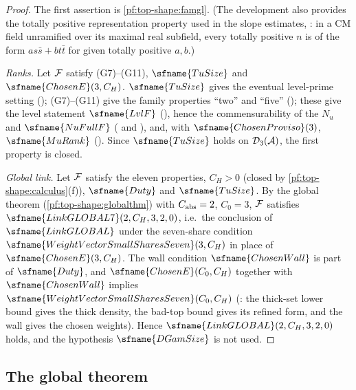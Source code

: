 \begin{proof}
The first assertion is \cref{pf:top-shape:famgl}. (The development also provides the totally positive
representation property used in the slope estimates, : in a CM field unramified
over its maximal real subfield, every totally positive $n$ is of the form $as\bar s+bt\bar t$ for given totally positive
$a,b$.)

\emph{Ranks.} Let $\mathcal{F}$ satisfy (G7)--(G11), $\sfname{TuSize}$ and $\sfname{ChosenE}(3,C_H)$. $\sfname{TuSize}$
gives the eventual level-prime setting (); (G7)--(G11)
give the family properties ``two'' and ``five''
(); these give the level statement
$\sfname{LvlF}$ (), hence the commensurability of the $N_u$ and
$\sfname{NuFullF}$ ( and ), and,
with $\sfname{ChosenProviso}(3)$, $\sfname{MuRank}$ (). Since
$\sfname{TuSize}$ holds on $\mathcal{D}_3(\mathcal A)$, the first property is closed.

\emph{Global link.} Let $\mathcal{F}$ satisfy the eleven properties, $C_H>0$ (closed by
\cref{pf:top-shape:calculus}(f)), $\sfname{Duty}$ and $\sfname{TuSize}$. By the global theorem
(\cref{pf:top-shape:globalthm}) with $C_{\rm abs}=2$, $C_0=3$, $\mathcal{F}$ satisfies $\sfname{LinkGLOBAL7}(2,C_H,3,2,0)$,
i.e.\ the conclusion of $\sfname{LinkGLOBAL}$ under the seven-share condition $\sfname{WeightVectorSmallSharesSeven}(3,C_H)$
in place of $\sfname{ChosenE}(3,C_H)$. The wall condition $\sfname{ChosenWall}$ is part of $\sfname{Duty}$, and
$\sfname{ChosenE}(C_0,C_H)$ together with $\sfname{ChosenWall}$ implies $\sfname{WeightVectorSmallSharesSeven}(C_0,C_H)$
(: the thick-set lower bound gives
the thick density, the bad-top bound gives its refined form, and the wall gives the chosen weights). Hence
$\sfname{LinkGLOBAL}(2,C_H,3,2,0)$ holds, and the hypothesis $\sfname{DGamSize}$ is not used.
\end{proof}

\subsection{The global theorem}\label{sec:pf:top-shape:global}


